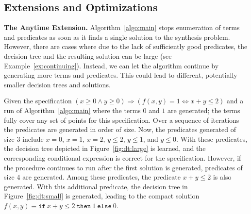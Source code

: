 \documentclass{llncs}
\newcommand\SynthFun{f}
\renewcommand{\paragraph}[1]{\par\noindent\textbf{#1.}}
\begin{document}
\subsection{Extensions and Optimizations}
\label{sec:optimizations}

\paragraph{The Anytime Extension}
Algorithm~\ref{algo:main} stops enumeration of terms and predicates as
soon as it finds a single solution to the synthesis problem.
However, there are cases where due to the lack of sufficiently good
predicates, the decision tree and the resulting solution can be large
(see Example~\ref{ex:continuing}).
Instead, we can let the algorithm continue by generating more
terms and predicates.
This could lead to different, potentially smaller decision trees and
solutions.

\begin{example}
  \label{ex:continuing}
  Given the specification $(x \geq 0 \wedge y \geq 0) \Rightarrow
(\SynthFun(x, y) = 1 \Leftrightarrow x + y \leq 2)$ and a run of
Algorithm~\ref{algo:main} where the terms $0$ and $1$ are generated;
the terms fully cover any set of points for this specification.
Over a sequence of iterations the predicates are generated in order
of size.  Now, the predicates generated of size $3$
include $x = 0$, $x = 1$, $x = 2$, $y \leq 2$, $y \leq 1$, and $y \leq
0$.  With these predicates, the decision tree depicted in
Figure~\ref{fig:dt:large} is learned, and the corresponding
conditional expression is correct for the specification.  However, if
the procedure continues to run after the first solution is generated,
predicates of size $4$ are generated.  Among these predicates, the
predicate $x + y \leq 2$ is also generated.  With this additional
predicate, the decision tree in Figure~\ref{fig:dt:small} is
generated, leading to the compact solution $\SynthFun(x, y) \equiv
\mathtt{if}~x + y \leq 2~\mathtt{then}~1~\mathtt{else}~0$.
\end{example}
\end{document}
